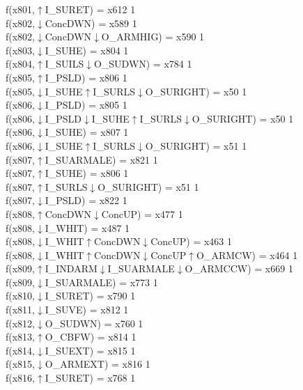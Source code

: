 f(x801,$\uparrow$I\_SURET) = x612 {1} \\
f(x802,$\downarrow$ConcDWN) = x589 {1} \\
f(x802,$\downarrow$ConcDWN$\downarrow$O\_ARMHIG) = x590 {1} \\
f(x803,$\downarrow$I\_SUHE) = x804 {1} \\
f(x804,$\uparrow$I\_SUILS$\downarrow$O\_SUDWN) = x784 {1} \\
f(x805,$\uparrow$I\_PSLD) = x806 {1} \\
f(x805,$\downarrow$I\_SUHE$\uparrow$I\_SURLS$\downarrow$O\_SURIGHT) = x50 {1} \\
f(x806,$\downarrow$I\_PSLD) = x805 {1} \\
f(x806,$\downarrow$I\_PSLD$\downarrow$I\_SUHE$\uparrow$I\_SURLS$\downarrow$O\_SURIGHT) = x50 {1} \\
f(x806,$\downarrow$I\_SUHE) = x807 {1} \\
f(x806,$\downarrow$I\_SUHE$\uparrow$I\_SURLS$\downarrow$O\_SURIGHT) = x51 {1} \\
f(x807,$\uparrow$I\_SUARMALE) = x821 {1} \\
f(x807,$\uparrow$I\_SUHE) = x806 {1} \\
f(x807,$\uparrow$I\_SURLS$\downarrow$O\_SURIGHT) = x51 {1} \\
f(x807,$\downarrow$I\_PSLD) = x822 {1} \\
f(x808,$\uparrow$ConcDWN$\downarrow$ConcUP) = x477 {1} \\
f(x808,$\downarrow$I\_WHIT) = x487 {1} \\
f(x808,$\downarrow$I\_WHIT$\uparrow$ConcDWN$\downarrow$ConcUP) = x463 {1} \\
f(x808,$\downarrow$I\_WHIT$\uparrow$ConcDWN$\downarrow$ConcUP$\uparrow$O\_ARMCW) = x464 {1} \\
f(x809,$\uparrow$I\_INDARM$\downarrow$I\_SUARMALE$\downarrow$O\_ARMCCW) = x669 {1} \\
f(x809,$\downarrow$I\_SUARMALE) = x773 {1} \\
f(x810,$\downarrow$I\_SURET) = x790 {1} \\
f(x811,$\downarrow$I\_SUVE) = x812 {1} \\
f(x812,$\downarrow$O\_SUDWN) = x760 {1} \\
f(x813,$\uparrow$O\_CBFW) = x814 {1} \\
f(x814,$\downarrow$I\_SUEXT) = x815 {1} \\
f(x815,$\downarrow$O\_ARMEXT) = x816 {1} \\
f(x816,$\uparrow$I\_SURET) = x768 {1} \\
